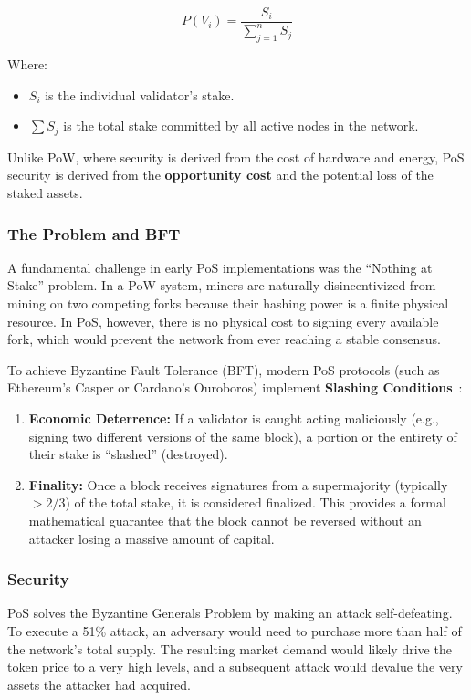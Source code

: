 \begin{equation}
    P(V_i) = \frac{S_i}{\sum_{j=1}^{n} S_j}
\end{equation}

Where:
\begin{itemize}
    \item $S_i$ is the individual validator's stake.
    \item $\sum S_j$ is the total stake committed by all active nodes in the network.
\end{itemize}

Unlike PoW, where security is derived from the cost of hardware and energy, PoS security is derived from the \textbf{opportunity cost} and the potential loss of the staked assets.

\subsubsection{The Problem and BFT}
A fundamental challenge in early PoS implementations was the \enquote{Nothing at Stake} problem. In a PoW system, miners are naturally disincentivized from mining on two competing forks because their hashing power is a finite physical resource. In PoS, however, there is no physical cost to signing every available fork, which would prevent the network from ever reaching a stable consensus.

To achieve Byzantine Fault Tolerance (BFT), modern PoS protocols (such as Ethereum's Casper or Cardano's Ouroboros) implement \textbf{Slashing Conditions}~\cite{formal2025beacon}:
\begin{enumerate}
    \item \textbf{Economic Deterrence:} If a validator is caught acting maliciously (e.g., signing two different versions of the same block), a portion or the entirety of their stake is \enquote{slashed} (destroyed).
    \item \textbf{Finality:} Once a block receives signatures from a supermajority (typically $>2/3$) of the total stake, it is considered finalized. This provides a formal mathematical guarantee that the block cannot be reversed without an attacker losing a massive amount of capital.
\end{enumerate}

\subsubsection{Security }
PoS solves the Byzantine Generals Problem by making an attack self-defeating. To execute a 51\% attack, an adversary would need to purchase more than half of the network's total supply. The resulting market demand would likely drive the token price to a very high levels, and a subsequent attack would devalue the very assets the attacker had acquired.

